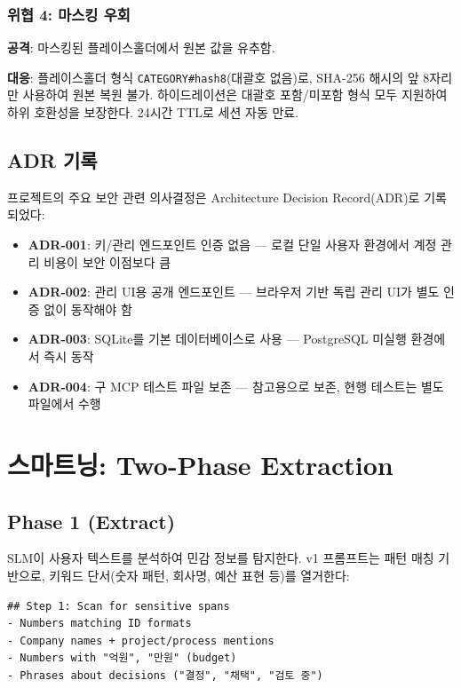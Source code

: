 \documentclass[11pt,a4paper]{article}
\begin{document}
\subsubsection{위협 4: 마스킹 우회}

\textbf{공격}: 마스킹된 플레이스홀더에서 원본 값을 유추함.

\textbf{대응}: 플레이스홀더 형식 \texttt{CATEGORY\#hash8}(대괄호 없음)로, SHA-256 해시의 앞 8자리만 사용하여 원본 복원 불가. 하이드레이션은 대괄호 포함/미포함 형식 모두 지원하여 하위 호환성을 보장한다. 24시간 TTL로 세션 자동 만료.

\subsection{ADR 기록}

프로젝트의 주요 보안 관련 의사결정은 Architecture Decision Record(ADR)로 기록되었다:

\begin{itemize}[nosep]
  \item \textbf{ADR-001}: 키/관리 엔드포인트 인증 없음 — 로컬 단일 사용자 환경에서 계정 관리 비용이 보안 이점보다 큼
  \item \textbf{ADR-002}: 관리 UI용 공개 엔드포인트 — 브라우저 기반 독립 관리 UI가 별도 인증 없이 동작해야 함
  \item \textbf{ADR-003}: SQLite를 기본 데이터베이스로 사용 — PostgreSQL 미실행 환경에서 즉시 동작
  \item \textbf{ADR-004}: 구 MCP 테스트 파일 보존 — 참고용으로 보존, 현행 테스트는 별도 파일에서 수행
\end{itemize}

\section{스마트닝: Two-Phase Extraction}

\subsection{Phase 1 (Extract)}

SLM이 사용자 텍스트를 분석하여 민감 정보를 탐지한다. v1 프롬프트는 패턴 매칭 기반으로, 키워드 단서(숫자 패턴, 회사명, 예산 표현 등)를 열거한다:

\begin{verbatim}
## Step 1: Scan for sensitive spans
- Numbers matching ID formats
- Company names + project/process mentions
- Numbers with "억원", "만원" (budget)
- Phrases about decisions ("결정", "채택", "검토 중")
\end{verbatim}
\end{document}
